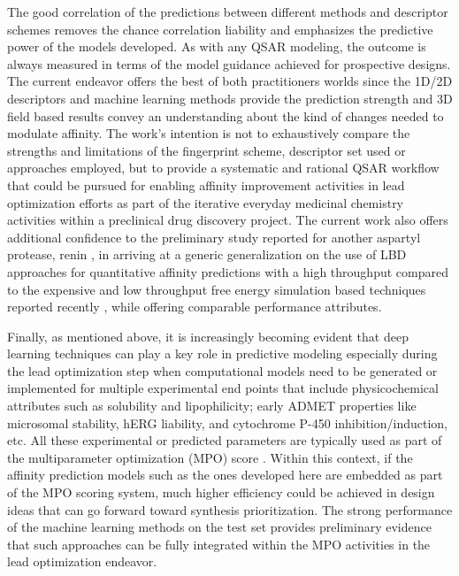 The good correlation of the predictions between different methods and descriptor schemes removes the chance correlation liability and emphasizes the predictive power of the models developed.  As with any QSAR modeling, the outcome is always measured in terms of the model guidance achieved for prospective designs.  The current endeavor offers the best of both practitioners worlds \cite{fujita2016understanding} since the 1D/2D descriptors and machine learning methods provide the prediction strength and 3D field based results convey an understanding about the kind of changes needed to modulate affinity. The work's intention is not to exhaustively compare the strengths and limitations of the fingerprint scheme, descriptor set used or approaches employed, but to provide a systematic and rational QSAR workflow that could be pursued for enabling affinity improvement activities in lead optimization efforts as part of the iterative everyday medicinal chemistry activities within a preclinical drug discovery project.  The current work also offers additional confidence to the preliminary study reported for another aspartyl protease, renin \cite{subramanian2012integrated}, in arriving at a generic generalization on the use of LBD approaches for quantitative affinity predictions with a high throughput compared to the expensive and low throughput free energy simulation based techniques reported recently \cite{wang2015accurate}, while offering comparable performance attributes. 

Finally, as mentioned above, it is increasingly becoming
evident that deep learning techniques can play a key role in
predictive modeling \cite{xu2015deep} especially during the lead optimization step when computational models need to be generated or
implemented for multiple experimental end points that include
physicochemical attributes such as solubility and lipophilicity;
early ADMET properties like microsomal stability, hERG
liability, and cytochrome P-450 inhibition/induction, etc. All
these experimental or predicted parameters are typically used as
part of the multiparameter optimization (MPO) score \cite{segall2016avoiding}. Within this context, if the affinity prediction models such as the ones developed here are embedded as part of the MPO scoring system, much higher efficiency could be achieved in design ideas that can go forward toward synthesis prioritization. The strong performance of the machine learning methods on the test set provides preliminary evidence that such approaches can be fully integrated within the MPO activities in the lead optimization endeavor.

